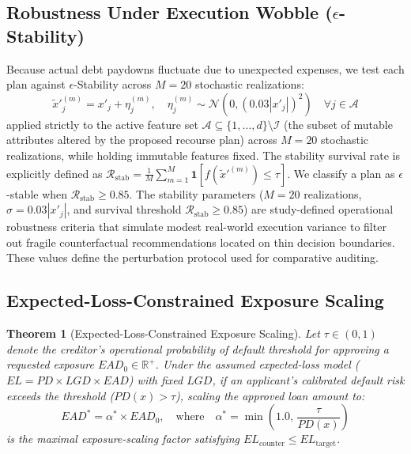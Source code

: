\documentclass[manuscript,screen,review,anonymous]{acmart}
\newtheorem{theorem}{Theorem}
\begin{document}
\subsection{Robustness Under Execution Wobble ($\epsilon$-Stability)}
Because actual debt paydowns fluctuate due to unexpected expenses, we test each plan against $\epsilon$-Stability across $M=20$ stochastic realizations:
\begin{equation}
\tilde{x}'^{(m)}_j = x'_j + \eta_j^{(m)}, \quad \eta_j^{(m)} \sim \mathcal{N}\left(0, (0.03 |x'_j|)^2\right) \quad \forall j \in \mathcal{A}
\end{equation}
applied strictly to the active feature set $\mathcal{A} \subseteq \{1, \dots, d\} \setminus \mathcal{I}$ (the subset of mutable attributes altered by the proposed recourse plan) across $M=20$ stochastic realizations, while holding immutable features fixed. The stability survival rate is explicitly defined as $\mathcal{R}_{\text{stab}} = \frac{1}{M} \sum_{m=1}^{M} \mathbf{1}[f(\tilde{x}'^{(m)}) \le \tau]$. We classify a plan as $\epsilon$-stable when $\mathcal{R}_{\text{stab}} \ge 0.85$. The stability parameters ($M=20$ realizations, $\sigma = 0.03 |x'_j|$, and survival threshold $\mathcal{R}_{\text{stab}} \ge 0.85$) are study-defined operational robustness criteria that simulate modest real-world execution variance to filter out fragile counterfactual recommendations located on thin decision boundaries. These values define the perturbation protocol used for comparative auditing.

\subsection{Expected-Loss-Constrained Exposure Scaling}

\begin{theorem}[Expected-Loss-Constrained Exposure Scaling]
Let $\tau \in (0, 1)$ denote the creditor's operational probability of default threshold for approving a requested exposure $EAD_0 \in \mathbb{R}^+$. Under the assumed expected-loss model ($EL = PD \times LGD \times EAD$) with fixed $LGD$, if an applicant's calibrated default risk exceeds the threshold ($PD(x) > \tau$), scaling the approved loan amount to:
\begin{equation}
EAD^* = \alpha^* \times EAD_0, \quad \text{where} \quad \alpha^* = \min\left(1.0, \, \frac{\tau}{PD(x)}\right)
\end{equation}
is the maximal exposure-scaling factor satisfying $EL_{\text{counter}} \le EL_{\text{target}}$.
\end{theorem}
\end{document}
